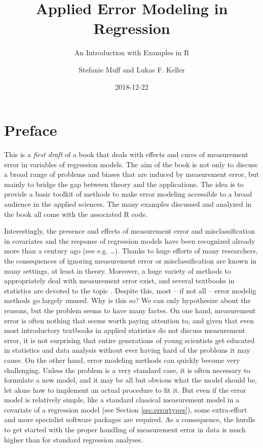 \documentclass[]{book}
\title{Applied Error Modeling in Regression}
\subtitle{An Introduction with Examples in R}
\author{Stefanie Muff and Lukas F. Keller}
\date{2018-12-22}
\theoremstyle{definition}
\theoremstyle{definition}
\theoremstyle{definition}
\theoremstyle{remark}
\begin{document}
\maketitle

{
\setcounter{tocdepth}{1}
\tableofcontents
}
\chapter*{Preface}\label{preface}

This is a \emph{first draft} of a book that deals with effects and cures
of measurement error in variables of regression models. The aim of the
book is not only to discuss a broad range of problems and biases that
are induced by measurement error, but mainly to bridge the gap between
theory and the applications. The idea is to provide a basic toolkit of
methods to make error modeling accessible to a broad audience in the
applied sciences. The many examples discussed and analyzed in the book
all come with the associated R code.

Interestingly, the presence and effects of measurement error and
misclassification in covariates and the response of regression models
have been recognized already more than a century ago (see e.g.
\ldots{}). Thanks to huge efforts of many researchers, the consequences
of ignoring measurement error or misclassification are known in many
settings, at least in theory. Moreover, a huge variety of methods to
appropriately deal with measurement error exist, and several textbooks
in statistics are devoted to the topic
\citep{fuller1987, gustafson2004, carroll.etal2006, yi2017}. Despite
this, most -- if not all -- error modelig methods go largely unused. Why
is this so? We can only hypothesize about the reasons, but the problem
seems to have many factes. On one hand, measurement error is often
nothing that seems worth paying attention to, and given that even most
introductory textbooks in applied statistics do not discuss measurement
error, it is not surprising that entire generations of young scientists
get educated in statistics and data analysis without ever having hard of
the problems it may cause. On the other hand, error modeling methods can
quickly become very challenging. Unless the problem is a very standard
case, it is often necessary to formulate a new model, and it may be all
but obvious what the model should be, let alone how to implement an
actual procedure to fit it. But even if the error model is relatively
simple, like a standard classical measurement model in a covariate of a
regression model (see Section \ref{sec:errortypes}), some extra-effort
and more specialist software packages are required. As a consequence,
the hurdle to get started with the proper handling of measurement error
in data is much higher than for standard regression analyses.
\end{document}
